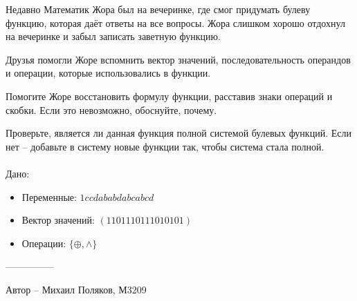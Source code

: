 \question
Недавно Математик Жора был на вечеринке, где смог придумать булеву функцию, которая даёт ответы на все вопросы. Жора слишком хорошо отдохнул на вечеринке и забыл записать заветную функцию.

Друзья помогли Жоре вспомнить вектор значений, последовательность операндов и операции, которые использовались в функции.

Помогите Жоре восстановить формулу функции, расставив знаки операций и скобки. Если это невозможно, обоснуйте, почему.

Проверьте, является ли данная функция полной системой булевых функций. Если нет -- добавьте в систему новые функции так, чтобы система стала полной.
\\
\\
Дано:
\begin{itemize}
\item Переменные: $1 c c d a b a b d a b c a b c d$
\item Вектор значений: $(1101110111010101)$
\item Операции: $\{\oplus, \land\}$
\end{itemize}

---------------

Автор -- Михаил Поляков, М3209